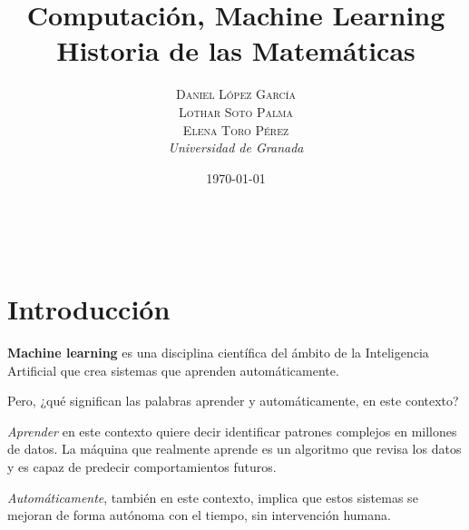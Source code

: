 \documentclass[a4paper, 11pt]{article} %
\title{\textbf{Computación, Machine Learning}\\ %
\vspace{20 pt}
Historia de las Matemáticas} %
\author{\textsc{Daniel López García\\
Lothar Soto Palma\\
Elena Toro Pérez} %
\\{\textit{Universidad de Granada}}} %
\date{\today} %
\makeatletter
\renewcommand{\maketitle}{ %
\begin{center} %
{\Huge\@title} %
\end{center}

\vspace{20pt} %

\begin{flushright} %
{\large\@author} %
\\\@date %

\vspace{40pt} %
\end{flushright}
\renewcommand{\baselinestretch}{0.5}

}
\makeatother
\begin{document}
	\maketitle
	\tableofcontents
	\listoffigures
	\newpage
\section{Introducción}
\textbf{Machine learning} es una disciplina científica del ámbito de la Inteligencia Artificial que crea sistemas que aprenden automáticamente.

Pero, ¿qué significan las palabras aprender y automáticamente, en este contexto?

\textit{Aprender} en este contexto quiere decir identificar patrones complejos en millones de datos. La máquina que realmente aprende es un algoritmo que revisa los datos y es capaz de predecir comportamientos futuros.

\textit{Automáticamente}, también en este contexto, implica que estos sistemas se mejoran de forma autónoma con el tiempo, sin intervención humana.
\end{document}
